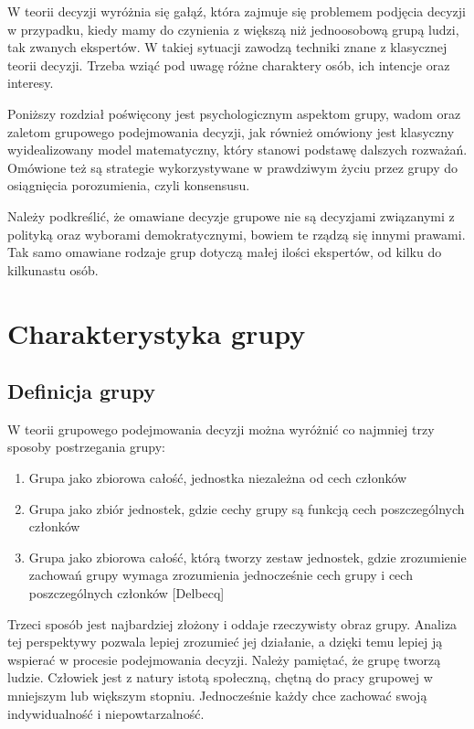 W teorii decyzji wyróżnia się gałąź, która zajmuje się problemem podjęcia decyzji 
w przypadku, kiedy mamy do czynienia z większą niż jednoosobową grupą ludzi, tak 
zwanych ekspertów. W takiej sytuacji zawodzą techniki znane  z klasycznej 
teorii decyzji. Trzeba wziąć pod uwagę różne charaktery osób, ich intencje oraz
interesy.

Poniższy rozdział poświęcony jest psychologicznym aspektom grupy, wadom oraz 
zaletom grupowego podejmowania decyzji, jak również omówiony jest klasyczny
wyidealizowany model matematyczny, który stanowi podstawę dalszych rozważań.
Omówione też są strategie wykorzystywane w prawdziwym życiu przez grupy do
osiągnięcia porozumienia, czyli konsensusu.

Należy podkreślić, że omawiane decyzje grupowe nie są decyzjami związanymi z
polityką oraz wyborami demokratycznymi, bowiem te rządzą się innymi prawami. Tak
samo omawiane rodzaje grup dotyczą małej ilości ekspertów, od kilku do
kilkunastu osób.
\section{Charakterystyka grupy}

\subsection{Definicja grupy}
W teorii grupowego podejmowania decyzji można wyróżnić co najmniej trzy sposoby 
postrzegania grupy:
\begin{enumerate}

\item Grupa jako zbiorowa całość, jednostka niezależna od cech członków

\item Grupa jako zbiór jednostek, gdzie cechy grupy są funkcją cech poszczególnych członków

\item Grupa jako zbiorowa całość, którą tworzy zestaw jednostek, gdzie zrozumienie 
zachowań grupy wymaga zrozumienia jednocześnie cech grupy i cech poszczególnych
członków [Delbecq]

\end{enumerate}
Trzeci sposób jest najbardziej złożony i oddaje rzeczywisty obraz grupy. Analiza tej 
perspektywy pozwala lepiej zrozumieć jej działanie, a dzięki temu lepiej ją wspierać 
w procesie podejmowania decyzji. Należy pamiętać, że grupę tworzą ludzie. Człowiek jest 
z natury istotą społeczną, chętną do pracy grupowej w mniejszym lub większym stopniu. 
Jednocześnie każdy chce zachować swoją indywidualność i niepowtarzalność. 

